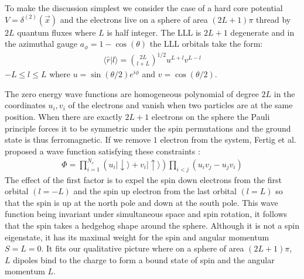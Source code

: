 \documentclass[a4paper,11pt]{article}
\newcommand{\zbar}{\overline z}
\begin{document}
To make the discussion simplest we consider the case 
of a hard core potential $V=\delta^{(2)}(\vec x)$ and
the electrons live on a sphere of area $(2L+1)\pi$
thread by $2L$ quantum fluxes where $L$ is half integer.
The LLL is $2L+1$ degenerate and in the azimuthal gauge $a_{\phi}=1-\cos(\theta)$ 
the LLL orbitals take the form:
\begin{eqnarray}
\langle \hat r|l\rangle={2L \choose l+L}^{1/2} u^{L+l} v^{L-l} 
\label{FORM}
\end{eqnarray}
$-L \le l \le L$ where $u=\sin(\theta/2)e^{i\phi}$ and 
$v=\cos(\theta/2)$.

The zero energy 
wave functions are
homogeneous polynomial of
degree $2L$ in the coordinates $u_i,v_i$
of the electrons
and vanish when two particles are at the same position.
When there are exactly $2L+1$ electrons on the sphere
the Pauli principle forces it to be symmetric under the spin permutations
and the ground state is thus ferromagnetic.
If we remove $1$ electron from the system, Fertig et al. \cite{MAC} proposed
a wave function satisfying these constraints :
\begin{eqnarray}
\Phi=\prod_{i=1}^{N_e}(u_i |\downarrow \rangle + 
v_i |\uparrow\rangle )\prod_{i<j} (u_i v_j- u_j v_i)
\end{eqnarray}
The effect of the first factor is to expel the spin down electrons from the first orbital $(l=-L)$
and the spin up electron from the last orbital $(l=L)$
so that the spin is up at the north pole and down at the south pole.
This wave function being invariant under simultaneous space and spin rotation, it follows
that the spin takes a hedgehog shape around the sphere.
Although it is not a spin eigenstate, it has its maximal weight for the spin and
angular momentum $S=L=0$.
It fits our qualitative picture where on a sphere of area $(2L+1)\pi$,
$L$ dipoles bind 
to the charge to form a bound state of spin and the angular 
momentum $L$.
  

\end{document}
